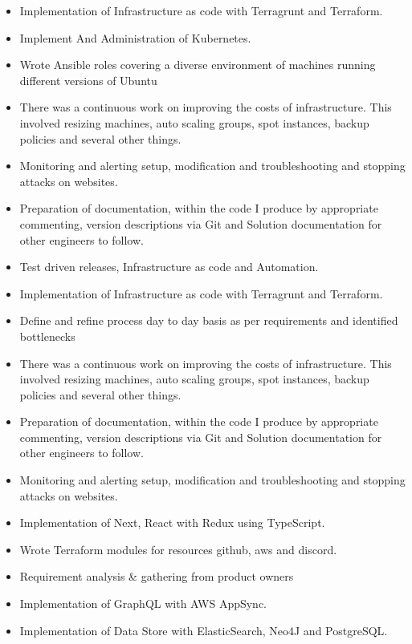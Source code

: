 \begin{itemize}
    \item Implementation of Infrastructure as code with Terragrunt and Terraform.
    \item Implement And Administration of Kubernetes.
    \item Wrote Ansible roles covering a diverse environment of machines running different versions of Ubuntu
    \item There was a continuous work on improving the costs of infrastructure. This involved resizing machines, auto scaling groups, spot instances, backup policies and several other things.
    \item Monitoring and alerting setup, modification and troubleshooting and stopping attacks on websites.
    \item Preparation of documentation, within the code I produce by appropriate commenting, version descriptions via Git and Solution documentation for other engineers to follow.
    \item Test driven releases, Infrastructure as code and Automation.
\end{itemize}

\divider

\begin{itemize}
    \item Implementation of Infrastructure as code with Terragrunt and Terraform.
    \item Define and refine process day to day basis as per requirements and identified bottlenecks
    \item There was a continuous work on improving the costs of infrastructure. This involved resizing machines, auto scaling groups, spot instances, backup policies and several other things.
    \item Preparation of documentation, within the code I produce by appropriate commenting, version descriptions via Git and Solution documentation for other engineers to follow.
    \item Monitoring and alerting setup, modification and troubleshooting and stopping attacks on websites.
    \item Implementation of Next, React with Redux using TypeScript.
    \item Wrote Terraform modules for resources github, aws and discord.
    \item Requirement analysis \& gathering from product owners
    \item Implementation of GraphQL with AWS AppSync.
    \item Implementation of Data Store with ElasticSearch, Neo4J and PostgreSQL.
\end{itemize}

